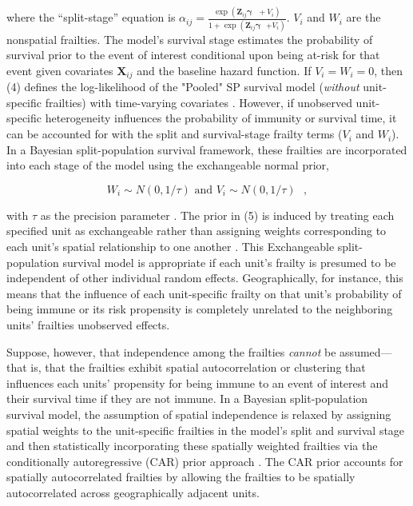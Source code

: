 \noindent where the ``split-stage'' equation is
$\alpha_{ij}=\frac{\exp\left(\mathbf{Z}_{ij}\boldsymbol{\gamma}\text{ }+V_{i}%
\right)}{1+\exp\left(\mathbf{Z}_{ij}\boldsymbol{\gamma}\text{ }\boldsymbol{+}V_{i}\right)}$. $V_{i}$ and $W_{i}$ are the nonspatial frailties. The model's survival
stage estimates the probability of survival prior to the event of interest
conditional upon being at-risk for that event given covariates $\mathbf{X}%
_{ij}$ and the baseline hazard function. If $V_{i}=W_{i}=0$, then (4)
defines the log-likelihood of the "Pooled" SP
survival model (\emph{without} unit-specific frailties) with time-varying
covariates \citep{ibrahim2001bayesian,lu2010}. However, if unobserved unit-specific heterogeneity influences the probability of immunity or survival time, it can be accounted for with
the split and survival-stage frailty terms ($V_{i}$ and $W_{i}$). In a
Bayesian split-population survival framework, these frailties are incorporated into each
stage of the model using the exchangeable normal prior,

\begin{equation}
W_{i}\sim N\left(0,1/\tau\right)\text{ and }V_{i}\sim N\left(0,1/\tau\right)\text{ },%
\end{equation}


\noindent with $\tau$ as the precision parameter
\citep{banerjee2003frailty, banerjee2004parametric}. The prior in (5) is induced by treating each specified unit as exchangeable
rather than assigning weights corresponding to each unit's spatial
relationship to one another \citep{bernardinelli1992,darmofal2009bayesian}.
This Exchangeable split-population survival model is appropriate if each
unit's frailty is presumed to be independent of other individual random
effects. Geographically, for instance, this means that the influence of each
unit-specific frailty on that unit's probability of being immune or its risk
propensity is completely unrelated to the neighboring units' frailties
unobserved effects.

Suppose, however, that independence among the frailties
\emph{cannot} be assumed---that is, that the frailties exhibit spatial
autocorrelation or clustering that influences each units'
propensity for being immune to an event of interest and their survival time if
they are not immune. In a Bayesian split-population survival model, the assumption of
spatial independence is relaxed by assigning spatial weights to the
unit-specific frailties in the model's split and survival stage and then
statistically incorporating these spatially weighted frailties via the
conditionally autoregressive (CAR) prior approach \citep{besag1991bayesian,banerjee2003frailty}. The CAR prior accounts for spatially autocorrelated frailties by allowing the
frailties to be spatially autocorrelated across geographically adjacent units.

